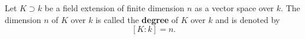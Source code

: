 Let $K \supset k$ be a field extension of finite dimension $n$ as a vector space over $k$. The dimension $n$ of $K$ over $k$ is called the \textbf{degree} of $K$ over $k$ and is denoted by
$$[K:k] = n.$$
